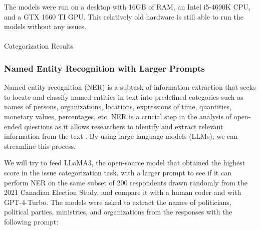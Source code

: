 \documentclass[
  authoryear,
  preprint,
  3p]{elsarticle}
\makeatletter
\let\oldparagraph\paragraph
\renewcommand{\paragraph}{
    \@ifstar
      \xxxParagraphStar
      \xxxParagraphNoStar
  }
\newcommand{\xxxParagraphStar}[1]{\oldparagraph*{#1}\mbox{}}
\newcommand{\xxxParagraphNoStar}[1]{\oldparagraph{#1}\mbox{}}
\makeatother
\begin{document}
The models were run on a desktop with 16GB of RAM, an Intel i5-4690K
CPU, and a GTX 1660 TI GPU. This relatively old hardware is still able
to run the models without any issues.

\paragraph{Categorization Results}\label{categorization-results}

\subsubsection{Named Entity Recognition with Larger
Prompts}\label{named-entity-recognition-with-larger-prompts}

Named entity recognition (NER) is a subtask of information extraction
that seeks to locate and classify named entities in text into predefined
categories such as names of persons, organizations, locations,
expressions of time, quantities, monetary values, percentages, etc. NER
is a crucial step in the analysis of open-ended questions as it allows
researchers to identify and extract relevant information from the text
\citep{yadav_bethard19}. By using large language models (LLMs), we can
streamline this process.

We will try to feed LLaMA3, the open-source model that obtained the
highest score in the issue categorization task, with a larger prompt to
see if it can perform NER on the same subset of 200 respondents drawn
randomly from the 2021 Canadian Election Study, and compare it with a
human coder and with GPT-4-Turbo. The models were asked to extract the
names of politicians, political parties, ministries, and organizations
from the responses with the following prompt:
\end{document}
